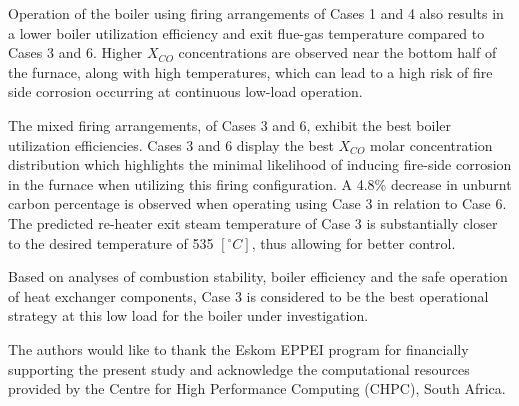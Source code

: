 \documentclass[twocolumn,10pt]{asme2ej}
\begin{document}
Operation of the boiler using firing arrangements of Cases 1 and 4 also results in a lower boiler utilization efficiency and exit flue-gas temperature compared to Cases 3 and 6. Higher $X_{CO}$ concentrations are observed near the bottom half of the furnace, along with high temperatures, which can lead to a high risk of fire side corrosion occurring at continuous low-load operation. 

The mixed firing arrangements, of Cases 3 and 6, exhibit the best boiler utilization efficiencies. Cases 3 and 6 display the best $X_{CO}$ molar concentration distribution which highlights the minimal likelihood of inducing fire-side corrosion in the furnace when utilizing this firing configuration. A 4.8\% decrease in unburnt carbon percentage is observed when operating using Case 3 in relation to Case 6. The predicted re-heater exit steam temperature of Case 3 is substantially closer to the desired temperature of 535 $[^\circ C]$, thus allowing for better control.

Based on analyses of combustion stability, boiler efficiency and the safe operation of heat exchanger components, Case 3 is considered to be the best operational strategy at this low load for the boiler under investigation.

\begin{acknowledgment}
The authors would like to thank the Eskom EPPEI program for financially supporting the present study and acknowledge the computational resources provided by the Centre for High Performance Computing (CHPC), South Africa.
\end{acknowledgment}

%





\end{document}
